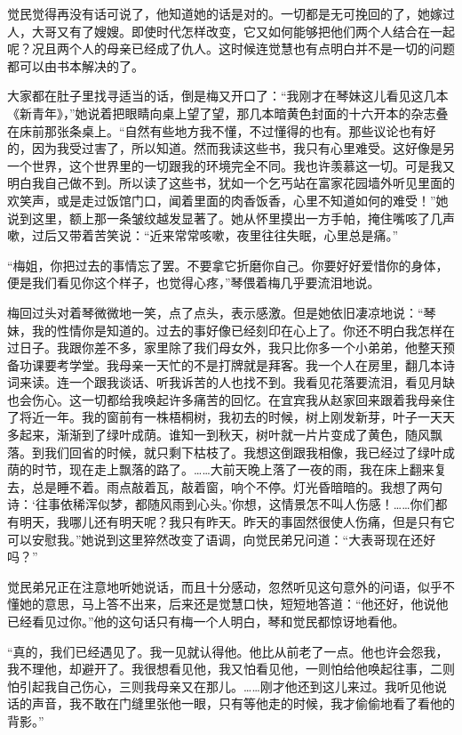 \par 觉民觉得再没有话可说了，他知道她的话是对的。一切都是无可挽回的了，她嫁过人，大哥又有了嫂嫂。即使时代怎样改变，它又如何能够把他们两个人结合在一起呢？况且两个人的母亲已经成了仇人。这时候连觉慧也有点明白并不是一切的问题都可以由书本解决的了。
\par 大家都在肚子里找寻适当的话，倒是梅又开口了：“我刚才在琴妹这儿看见这几本《新青年》，”她说着把眼睛向桌上望了望，那几本暗黄色封面的十六开本的杂志叠在床前那张条桌上。“自然有些地方我不懂，不过懂得的也有。那些议论也有好的，因为我受过害了，所以知道。然而我读这些书，我只有心里难受。这好像是另一个世界，这个世界里的一切跟我的环境完全不同。我也许羡慕这一切。可是我又明白我自己做不到。所以读了这些书，犹如一个乞丐站在富家花园墙外听见里面的欢笑声，或是走过饭馆门口，闻着里面的肉香饭香，心里不知道如何的难受！”她说到这里，额上那一条皱纹越发显著了。她从怀里摸出一方手帕，掩住嘴咳了几声嗽，过后又带着苦笑说：“近来常常咳嗽，夜里往往失眠，心里总是痛。”
\par “梅姐，你把过去的事情忘了罢。不要拿它折磨你自己。你要好好爱惜你的身体，便是我们看见你这个样子，也觉得心疼，”琴偎着梅几乎要流泪地说。
\par 梅回过头对着琴微微地一笑，点了点头，表示感激。但是她依旧凄凉地说：“琴妹，我的性情你是知道的。过去的事好像已经刻印在心上了。你还不明白我怎样在过日子。我跟你差不多，家里除了我们母女外，我只比你多一个小弟弟，他整天预备功课要考学堂。我母亲一天忙的不是打牌就是拜客。我一个人在房里，翻几本诗词来读。连一个跟我谈话、听我诉苦的人也找不到。我看见花落要流泪，看见月缺也会伤心。这一切都给我唤起许多痛苦的回忆。在宜宾我从赵家回来跟着我母亲住了将近一年。我的窗前有一株梧桐树，我初去的时候，树上刚发新芽，叶子一天天多起来，渐渐到了绿叶成荫。谁知一到秋天，树叶就一片片变成了黄色，随风飘落。到我们回省的时候，就只剩下枯枝了。我想这倒跟我相像，我已经过了绿叶成荫的时节，现在走上飘落的路了。……大前天晚上落了一夜的雨，我在床上翻来复去，总是睡不着。雨点敲着瓦，敲着窗，响个不停。灯光昏暗暗的。我想了两句诗：‘往事依稀浑似梦，都随风雨到心头。’你想，这情景怎不叫人伤感！……你们都有明天，我哪儿还有明天呢？我只有昨天。昨天的事固然很使人伤痛，但是只有它可以安慰我。”她说到这里猝然改变了语调，向觉民弟兄问道：“大表哥现在还好吗？”
\par 觉民弟兄正在注意地听她说话，而且十分感动，忽然听见这句意外的问语，似乎不懂她的意思，马上答不出来，后来还是觉慧口快，短短地答道：“他还好，他说他已经看见过你。”他的这句话只有梅一个人明白，琴和觉民都惊讶地看他。
\par “真的，我们已经遇见了。我一见就认得他。他比从前老了一点。他也许会怨我，我不理他，却避开了。我很想看见他，我又怕看见他，一则怕给他唤起往事，二则怕引起我自己伤心，三则我母亲又在那儿。……刚才他还到这儿来过。我听见他说话的声音，我不敢在门缝里张他一眼，只有等他走的时候，我才偷偷地看了看他的背影。”
